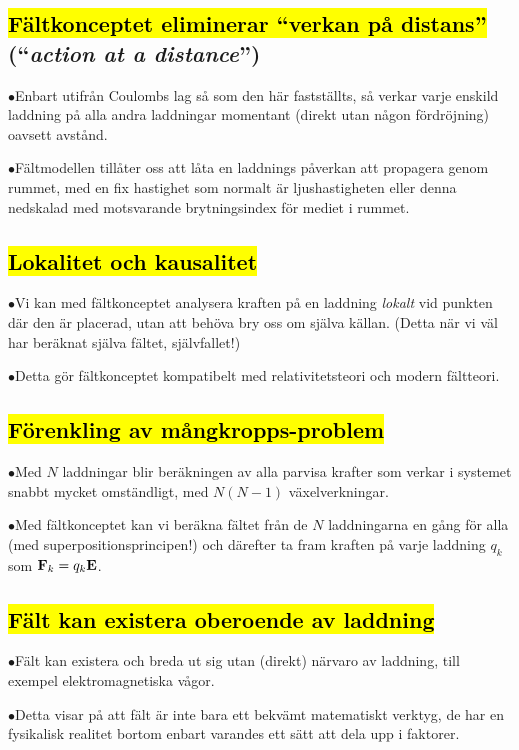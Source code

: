 \subsection{{\hl{F{\"a}ltkonceptet eliminerar ``verkan p{\aa} distans''}}
  (``{\it action at a distance}'')}
\item{$\bullet$}{Enbart utifr{\aa}n Coulombs lag s{\aa} som den h{\"a}r
  fastst{\"a}llts, s{\aa} verkar varje enskild laddning p{\aa} alla andra
  laddningar momentant (direkt utan n{\aa}gon f{\"o}rdr{\"o}jning) oavsett
  avst{\aa}nd.}
\item{$\bullet$}{F{\"a}ltmodellen till{\aa}ter oss att l{\aa}ta en laddnings
  p{\aa}verkan att propagera genom rummet, med en fix hastighet som normalt
  {\"a}r ljushastigheten  eller denna nedskalad med
  motsvarande brytningsindex  f{\"o}r mediet i rummet.}

\subsection{\hl{Lokalitet och kausalitet}}
\item{$\bullet$}{Vi kan med f{\"a}ltkonceptet analysera kraften p{\aa} en
  laddning {\it lokalt} vid punkten d{\"a}r den {\"a}r placerad, utan att
  beh{\"o}va bry oss om sj{\"a}lva k{\"a}llan. (Detta n{\"a}r vi v{\"a}l
  har ber{\"a}knat sj{\"a}lva f{\"a}ltet, sj{\"a}lvfallet!)}
\item{$\bullet$}{Detta g{\"o}r f{\"a}ltkonceptet kompatibelt med
  relativitetsteori  och modern
  f{\"a}ltteori.}

\subsection{\hl{F{\"o}renkling av m{\aa}ngkropps-problem}}
\item{$\bullet$}{Med $N$ laddningar blir ber{\"a}kningen av alla parvisa
  krafter som verkar i systemet snabbt mycket omst{\"a}ndligt, med $N(N-1)$
  v{\"a}xelverkningar.}
\item{$\bullet$}{Med f{\"a}ltkonceptet kan vi ber{\"a}kna f{\"a}ltet fr{\aa}n
  de $N$ laddningarna en g{\aa}ng f{\"o}r alla (med superpositionsprincipen!)
  och d{\"a}refter ta fram kraften p{\aa} varje laddning $q_k$ som
  ${\bf F}_k=q_k{\bf E}$.}

\subsection{\hl{F{\"a}lt kan existera oberoende av laddning}}
\item{$\bullet$}{F{\"a}lt kan existera och breda ut sig utan (direkt)
  n{\"a}rvaro av laddning, till exempel elektromagnetiska v{\aa}gor.}
\item{$\bullet$}{Detta visar p{\aa} att f{\"a}lt {\"a}r inte bara ett
  bekv{\"a}mt matematiskt verktyg, de har en fysikalisk realitet bortom
  enbart varandes ett s{\"a}tt att dela upp  i
  faktorer.}
\vfill\eject

